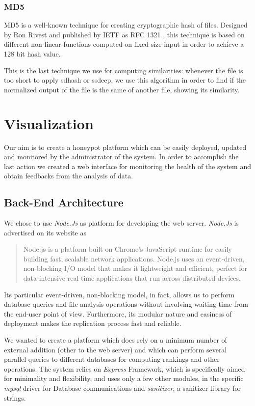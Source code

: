 \subsubsection{MD5}
MD5 is a well-known technique for creating cryptographic hash of files. Designed by Ron Rivest and published by IETF as RFC 1321 \cite{md5}, this technique is based on different non-linear functions computed on fixed size input in order to achieve a 128 bit hash value.

This is the last technique we use for computing similarities: whenever the file is too short to apply sdhash or ssdeep, we use this algorithm in order to find if the normalized output of the file is the same of another file, showing its similarity.

\section{Visualization}

Our aim is to create a honeypot platform which can be easily deployed, updated and monitored by the administrator of the system. In order to accomplish the last action we created a web interface for monitoring the health of the system and obtain feedbacks from the analysis of data.

\subsection{Back-End Architecture}

We chose to use \emph{Node.Js} as platform for developing the web server. \emph{Node.Js} is advertised on its website \cite{node_home} as
\begin{quotation}
Node.js is a platform built on Chrome's JavaScript runtime for easily building fast, scalable network applications. Node.js uses an event-driven, non-blocking I/O model that makes it lightweight and efficient, perfect for data-intensive real-time applications that run across distributed devices.
\end{quotation}

Its particular event-driven, non-blocking model, in fact, allows us to perform database queries and file analysis operations without involving waiting time from the end-user point of view. Furthermore, its modular nature and easiness of deployment makes the replication process fast and reliable.

We wanted to create a platform which does rely on a minimum number of external addition (other to the web server) and which can perform several parallel queries to different databases for computing rankings and other operations. The system relies on \emph{Express} \cite{express_node} Framework, which is specifically aimed for minimality and flexibility, and uses only a few other modules, in the specific \emph{mysql} driver for Database communications and \emph{sanitizer}, a sanitizer library for strings.

